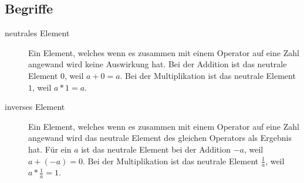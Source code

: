 \documentclass{article}
\begin{document}
\subsection{Begriffe}
\begin{description}
 \item[neutrales Element] Ein Element, welches wenn es zusammen mit einem Operator auf eine Zahl angewand wird keine Auswirkung hat. Bei der Addition ist das neutrale Element $0$, weil $a+0=a$. Bei der Multiplikation ist das neutrale Element $1$, weil $a*1=a$.
 \item[inverses Element] Ein Element, welches wenn es zusammen mit einem Operator auf eine Zahl angewand wird das neutrale Element des gleichen Operators als Ergebnis hat. Für ein $a$ ist das neutrale Element bei der Addition $-a$, weil $a+(-a)=0$. Bei der Multiplikation ist das neutrale Element $\tfrac{1}{a}$, weil $a*\tfrac{1}{a}=1$.
\end{description}
\end{document}
